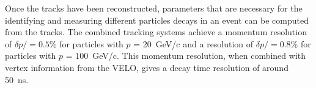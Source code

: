 Once the tracks have been reconstructed, parameters that are necessary for the identifying and measuring different particles decays in an event can be computed from the tracks. The combined tracking systems achieve a momentum resolution of $\delta p / = 0.5\%$ for particles with $p$ =  20~GeV/c and a resolution of $\delta p / = 0.8\%$ for particles with $p$ =  100~GeV/c.  This momentum resolution, when combined with vertex information from the VELO, gives a decay time resolution of around 50~ns. 












